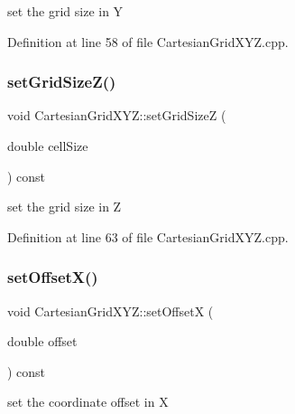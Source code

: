 set the grid size in Y 



Definition at line 58 of file Cartesian\+Grid\+X\+Y\+Z.\+cpp.

\hypertarget{class_d_d4hep_1_1_geometry_1_1_cartesian_grid_x_y_z_a4f8424dd37aca73fb7d90179869dd3b1}{}\label{class_d_d4hep_1_1_geometry_1_1_cartesian_grid_x_y_z_a4f8424dd37aca73fb7d90179869dd3b1} 
\subsubsection{\texorpdfstring{set\+Grid\+Size\+Z()}{setGridSizeZ()}}
{\footnotesize\ttfamily void Cartesian\+Grid\+X\+Y\+Z\+::set\+Grid\+SizeZ (\begin{DoxyParamCaption}\item[{double}]{cell\+Size }\end{DoxyParamCaption}) const}



set the grid size in Z 



Definition at line 63 of file Cartesian\+Grid\+X\+Y\+Z.\+cpp.

\hypertarget{class_d_d4hep_1_1_geometry_1_1_cartesian_grid_x_y_z_a00dd0a96276deeeed7507f9e91320bb0}{}\label{class_d_d4hep_1_1_geometry_1_1_cartesian_grid_x_y_z_a00dd0a96276deeeed7507f9e91320bb0} 
\subsubsection{\texorpdfstring{set\+Offset\+X()}{setOffsetX()}}
{\footnotesize\ttfamily void Cartesian\+Grid\+X\+Y\+Z\+::set\+OffsetX (\begin{DoxyParamCaption}\item[{double}]{offset }\end{DoxyParamCaption}) const}



set the coordinate offset in X 



